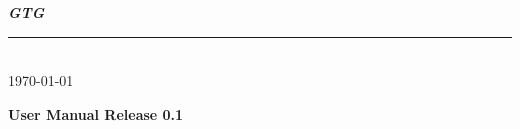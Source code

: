 \documentclass{article}
\begin{document}
\noindent
{\Huge\bfseries \textit{GTG} }\\
\rule[1ex]{\textwidth}{1pt}\\[1ex]
\textsf{\Large {} \today}\\




\begin{center}
{

\Huge\bfseries\center User Manual
\medskip
\Large\bfseries\center Release 0.1
}



\end{center}

\tableofcontents




\end{document}
